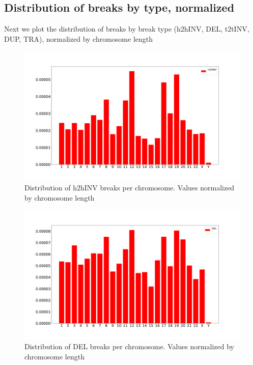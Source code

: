 \documentclass[a4paper,10pt]{article}
\begin{document}
\pagebreak

\subsection*{Distribution of breaks by type, normalized}

Next we plot the distribution of breaks by break type (h2hINV, DEL, t2tINV, DUP, TRA), normalized by chromosome length

\begin{figure}[H]
\includegraphics[scale=0.2]{figures/h2hINV_Break_distribution_normalized.pdf}
\caption{Distribution of h2hINV breaks per chromosome. Values normalized by chromosome length}
\end{figure}

\begin{figure}[H]
\includegraphics[scale=0.2]{figures/DEL_Break_distribution_normalized.pdf}
\caption{Distribution of DEL breaks per chromosome. Values normalized by chromosome length}
\end{figure}
\end{document}
